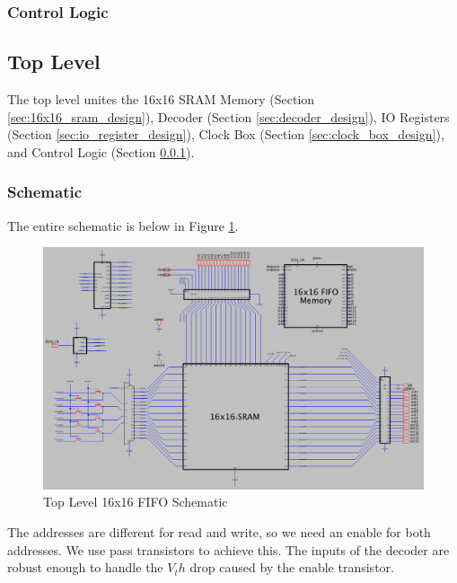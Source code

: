 \documentclass[a4paper]{article}
\begin{document}
\subsubsection{Control Logic}
\label{sec:control_logic_design}

\newpage
\subsection{Top Level}
The top level unites the 16x16 SRAM Memory (Section \ref{sec:16x16_sram_design}), Decoder (Section \ref{sec:decoder_design}), IO Registers (Section \ref{sec:io_register_design}), Clock Box (Section \ref{sec:clock_box_design}), and Control Logic (Section \ref{sec:control_logic_design}). 

\subsubsection{Schematic}
The entire schematic is below in Figure \ref{fig:topLevelSchematic}.

\begin{figure}[H]
	\centering
	\includegraphics[scale=0.3]{topLevelSchematic}
	\caption{Top Level 16x16 FIFO Schematic}
	\label{fig:topLevelSchematic}
\end{figure}

The addresses are different for read and write, so we need an enable for both addresses. We use pass transistors to achieve this. The inputs of the decoder are robust enough to handle the $V_th$ drop caused by the enable transistor.
\end{document}
